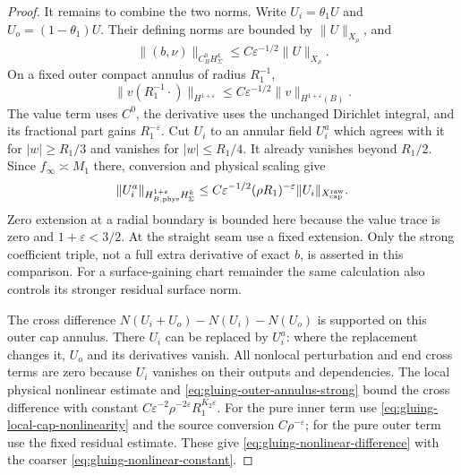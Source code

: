 \documentclass[11pt]{amsart}
\theoremstyle{definition}
\theoremstyle{remark}
\theoremstyle{plain}
\begin{document}
\begin{proof}
It remains to combine the two norms. Write $U_i=\theta_1U$ and
$U_o=(1-\theta_1)U$. Their defining norms are bounded by
$\|U\|_{X_\rho}$, and
\[
                  \|(b,\nu)\|_{C_B^0H^k_\Sigma}
                               \leq C\varepsilon^{-1/2}\|U\|_{X_\rho}.
\]
On a fixed outer compact annulus of radius $R_1^{-1}$,
\[
 \|v(R_1^{-1}\cdot)\|_{H^{1+\varepsilon}}
                         \leq C\varepsilon^{-1/2}\|v\|_{H^{1+\varepsilon}(B)}.
\]
The value term uses $C^0$, the derivative uses the unchanged
Dirichlet integral, and its fractional part gains $R_1^{-\varepsilon}$.
Cut $U_i$ to an annular field $U_i^a$ which agrees with it for
$|w|\geq R_1/3$ and vanishes for $|w|\leq R_1/4$.
It already vanishes beyond $R_1/2$. Since $f_\infty\asymp M_1$
there, conversion and physical scaling give
\begin{equation}\label{eq:gluing-outer-annulus-strong}
 \|U_i^a\|_{H_{B,\rm phys}^{1+\varepsilon}H^k_\Sigma}
       \leq C\varepsilon^{-1/2}(\rho R_1)^{-\varepsilon}
                                             \|U_i\|_{X^{\rm raw}_{\rm cap}}.
\end{equation}
Zero extension at a radial boundary is bounded here because the
value trace is zero and $1+\varepsilon<3/2$. At the straight
seam use a fixed extension. Only the strong coefficient triple,
not a full extra derivative of exact $b$, is asserted in this
comparison. For a surface-gaining chart remainder the same calculation
also controls its stronger residual surface norm.

The cross difference $N(U_i+U_o)-N(U_i)-N(U_o)$ is supported
on this outer cap annulus. There $U_i$ can be replaced by $U_i^a$:
where the replacement changes it, $U_o$ and its derivatives vanish.
All nonlocal perturbation and end cross terms are zero because
$U_i$ vanishes on their outputs and dependencies. The local physical
nonlinear estimate and \eqref{eq:gluing-outer-annulus-strong} bound
the cross difference with constant
$C\varepsilon^{-2}\rho^{-2\varepsilon}R_1^{K_2\varepsilon}$.
For the pure inner term use \eqref{eq:gluing-local-cap-nonlinearity}
and the source conversion $C\rho^{-\varepsilon}$; for the pure
outer term use the fixed residual estimate. These give
\eqref{eq:gluing-nonlinear-difference} with the coarser
\eqref{eq:gluing-nonlinear-constant}.


\end{proof}
\end{document}
